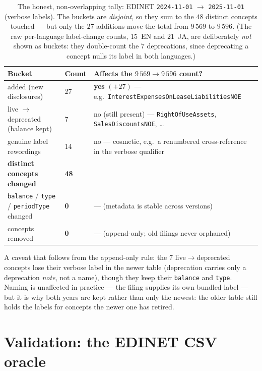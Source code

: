 \documentclass[11pt,a4paper]{report}
\begin{document}
\begin{table}[h]
\centering
\small
\caption{The honest, non-overlapping tally: EDINET \texttt{2024-11-01} \(\to\) \texttt{2025-11-01} (verbose
labels). The buckets are \emph{disjoint}, so they sum to the \(48\) distinct concepts touched --- but only
the \(27\) additions move the total from \(9\,569\) to \(9\,596\). (The raw per-language label-change
counts, \(15\)~EN and \(21\)~JA, are deliberately \emph{not} shown as buckets: they double-count the \(7\)
deprecations, since deprecating a concept nulls its label in both languages.)}
\label{tab:edinet-taxdiff}
\begin{tabular}{@{}p{}p{}p{}@{}}
\toprule
\textbf{Bucket} & \textbf{Count} & \textbf{Affects the \(9\,569{\to}9\,596\) count?} \\
\midrule
added (new disclosures) & 27 & \textbf{yes} \((+27)\) --- e.g.\ \texttt{InterestExpensesOnLeaseLiabilitiesNOE} \\
live \(\to\) deprecated (balance kept) & 7 & no (still present) --- \texttt{RightOfUseAssets}, \texttt{SalesDiscountsNOE}, \ldots \\
genuine label rewordings & 14 & no --- cosmetic, e.g.\ a renumbered cross-reference in the verbose qualifier \\
\midrule
\textbf{distinct concepts changed} & \textbf{48} & \\
\texttt{balance} / \texttt{type} / \texttt{periodType} changed & \textbf{0} & --- (metadata is stable across versions) \\
concepts removed & \textbf{0} & --- (append-only; old filings never orphaned) \\
\bottomrule
\end{tabular}
\end{table}

\noindent A caveat that follows from the append-only rule: the 7 live\(\to\)deprecated concepts lose their
verbose label in the newer table (deprecation carries only a deprecation \emph{note}, not a name), though
they keep their \texttt{balance} and \texttt{type}. Naming is unaffected in practice --- the filing supplies
its own bundled label --- but it is why both years are kept rather than only the newest: the older table
still holds the labels for concepts the newer one has retired.

\section{Validation: the EDINET CSV oracle}
\label{sec:edinet-oracle}
\end{document}
